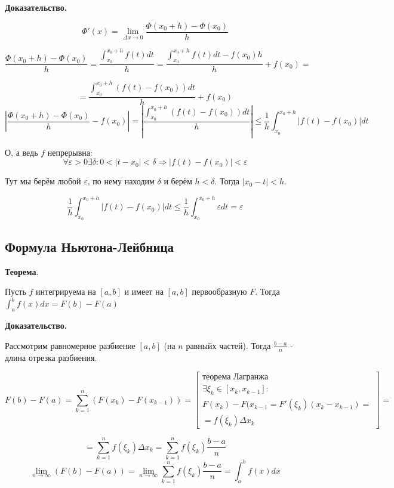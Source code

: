 \documentclass[a4paper]{article}
\begin{document}
\begin{definit}
\begin{hproof}\textbf{Доказательство.}

\[
\Phi'(x) = \lim_{\Delta x \rightarrow 0} \frac{\Phi(x_0 + h) - \Phi(x_0)}{h}
\]

\[
 \frac{\Phi(x_0 + h) - \Phi(x_0)}{h} = \frac{\int_{x_0}^{x_0+h} f(t)dt}{h} = \frac{\int_{x_0}^{x_0+h} f(t)dt - f(x_0)h}{h} + f(x_0) = 
\]

\[
 = \frac{\int_{x_0}^{x_0+h} (f(t) - f(x_0))dt}{h} + f(x_0)
\]
\[
\left|  \frac{\Phi(x_0 + h) - \Phi(x_0)}{h} - f(x_0) \right| = \left| \frac{\int_{x_0}^{x_0+h} (f(t) - f(x_0))dt}{h} \right| \leq \frac{1}{h} \int_{x_0}^{x_0+h} |f(t) - f(x_0)|dt
\]

О, а ведь $f$ непрерывна: 
\[
\forall \varepsilon > 0 \exists \delta: 0<|t-x_0|<\delta \Rightarrow |f(t) - f(x_0)| < \varepsilon
\]

Тут мы берём любой $\varepsilon$, по нему находим $\delta$ и берём $h < \delta$. Тогда $|x_0-t| < h$.


\[
\frac{1}{h} \int_{x_0}^{x_0+h} |f(t) - f(x_0)|dt \leq \frac{1}{h} \int_{x_0}^{x_0+h} \varepsilon dt = \varepsilon
\]
\end{hproof}


\end{definit}

\begin{definit}
\hypertarget{p13}{}
\subsection*{Формула Ньютона-Лейбница}

\begin{htheorem}\textbf{Теорема}.

Пусть $f$ интегрируема на $[a,b]$ и имеет на $[a,b]$ первообразную $F$. Тогда $\int_a^b f(x)dx = F(b) - F(a)$
\end{htheorem}

\begin{hproof}\textbf{Доказательство.}

Рассмотрим равномерное разбиение $[a,b]$ (на $n$ равныйх частей). Тогда $\frac{b-a}{n}$ - длина отрезка разбиения.

\[
F(b) - F(a) = \sum_{k=1}^n (F(x_k) - F(x_{k-1})) = \begin{bmatrix}
\text{теорема Лагранжа} \\
\exists \xi_k \in [x_k, x_{k-1}]: \\
F(x_k)-F(x_{k-1} = F'(\xi_k)(x_k-x_{k-1}) = \\ = f(\xi_k) \Delta x_k
\end{bmatrix} = 
\]

\[
 = \sum_{k=1}^n f(\xi_k) \Delta x_k = \sum_{k=1}^n f(\xi_k) \frac{b-a}{n}
\]
\[
\lim_{n \rightarrow \infty} (F(b)-F(a)) = \lim_{n \rightarrow \infty} \sum_{k=1}^n f(\xi_k) \frac{b-a}{n} = \int_a^b f(x)dx
\]
\end{hproof}

\end{definit}
\end{document}
